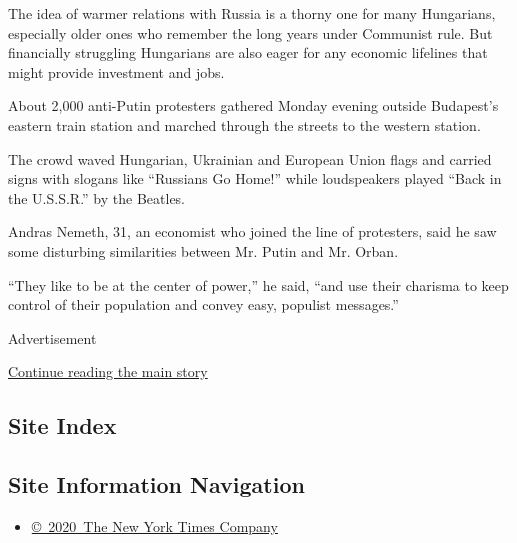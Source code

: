 The idea of warmer relations with Russia is a thorny one for many
Hungarians, especially older ones who remember the long years under
Communist rule. But financially struggling Hungarians are also eager for
any economic lifelines that might provide investment and jobs.

About 2,000 anti-Putin protesters gathered Monday evening outside
Budapest's eastern train station and marched through the streets to the
western station.

The crowd waved Hungarian, Ukrainian and European Union flags and
carried signs with slogans like ``Russians Go Home!'' while loudspeakers
played ``Back in the U.S.S.R.'' by the Beatles.

Andras Nemeth, 31, an economist who joined the line of protesters, said
he saw some disturbing similarities between Mr. Putin and Mr. Orban.

``They like to be at the center of power,'' he said, ``and use their
charisma to keep control of their population and convey easy, populist
messages.''

Advertisement

\protect\hyperlink{after-bottom}{Continue reading the main story}

\hypertarget{site-index}{%
\subsection{Site Index}\label{site-index}}

\hypertarget{site-information-navigation}{%
\subsection{Site Information
Navigation}\label{site-information-navigation}}

\begin{itemize}
\tightlist
\item
  \href{https://help.nytimes.com/hc/en-us/articles/115014792127-Copyright-notice}{©~2020~The
  New York Times Company}
\end{itemize}

